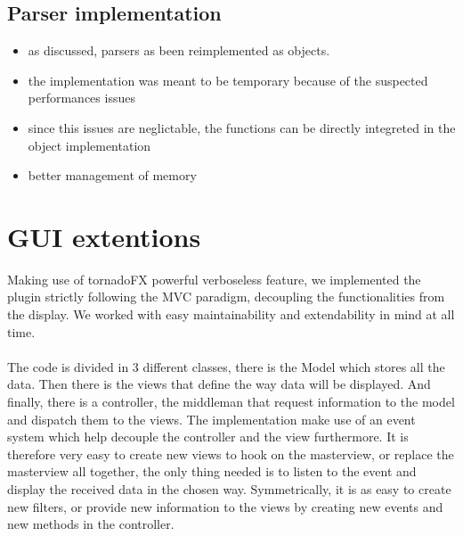 		\subsection{Parser implementation}
		\begin{itemize}
			\item as discussed, parsers as been reimplemented as objects.
			\item the implementation was meant to be temporary because of the suspected performances issues
			\item since this issues are neglictable, the functions can be directly integreted in the object implementation
			\item better management of memory
		\end{itemize}

	
	\section{GUI extentions}
	Making use of tornadoFX powerful verboseless feature, we implemented the plugin strictly following the MVC paradigm, decoupling the functionalities from the display. We worked with easy maintainability and extendability in mind at all time. 

	\paragraph{}

	The code is divided in 3 different classes, there is the Model which stores all the data. Then there is the views that define the way data will be displayed. And finally, there is a controller, the middleman that request information to the model and dispatch them to the views. The implementation make use of an event system which help decouple the controller and the view furthermore. It is therefore very easy to create new views to hook on the masterview, or replace the masterview all together, the only thing needed is to listen to the event and display the received data in the chosen way. Symmetrically, it is as easy to create new filters, or provide new information to the views by creating new events and new methods in the controller.


